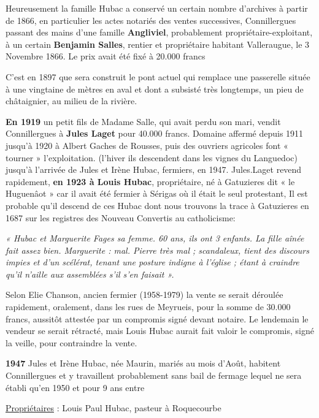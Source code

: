 
Heureusement la famille Hubac a conservé un certain nombre d’archives à partir de 1866, en
particulier les actes notariés des ventes successives, Connillergues passant des mains d’une
famille \textbf{Angliviel}, probablement propriétaire-exploitant, à un certain \textbf{Benjamin Salles}, rentier
et propriétaire habitant Valleraugue, le 3 Novembre 1866. Le prix avait été fixé à 20.000
francs

C’est en 1897 que sera construit le pont actuel qui remplace une passerelle située à une
vingtaine de mètres en aval et dont a subsisté très longtemps, un pieu de châtaignier, au milieu
de la rivière.

\textbf{En 1919} un petit fils de Madame Salle, qui avait perdu son mari, vendit Connillergues à \textbf{Jules
Laget} pour 40.000 francs. Domaine affermé depuis 1911 jusqu’à 1920 à Albert Gaches de
Rousses, puis des ouvriers agricoles font « tourner » l’exploitation. (l’hiver ils descendent
dans les vignes du Languedoc) jusqu’à l’arrivée de Jules et Irène Hubac, fermiers, en 1947.
Jules.Laget revend rapidement, \textbf{en 1923 à Louis Hubac}, propriétaire, né à Gatuzieres dit « le
Huguenâot » car il avait été fermier à Sérigas où il était le seul protestant, Il est probable qu’il
descend de ces Hubac dont nous trouvons la trace à Gatuzieres en 1687 sur les registres des
Nouveau Convertis au catholicisme:

\textit{« Hubac et Marguerite Fages sa femme. 60 ans, ils ont 3 enfants. La fille aînée fait assez bien.
Marguerite : mal. Pierre très mal ; scandaleux, tient des discours impies et d’un scélérat,
tenant une posture indigne à l’église ; étant à craindre qu’il n’aille aux assemblées s’il s’en
faisait ».}

Selon Elie Chanson, ancien fermier (1958-1979) la vente se serait déroulée rapidement,
oralement, dans les rues de Meyrueis, pour la somme de 30.000 francs, aussitôt attestée par un
compromis signé devant notaire. Le lendemain le vendeur se serait rétracté, mais Louis Hubac
aurait fait valoir le compromis, signé la veille, pour contraindre la vente.

\textbf{1947} Jules et Irène Hubac, née Maurin, mariés au mois d’Août, habitent Connillergues et y
travaillent probablement sans bail de fermage lequel ne sera établi qu’en 1950 et pour 9 ans
entre

\underline{Propriétaires} : Louis Paul Hubac, pasteur à Roquecourbe

